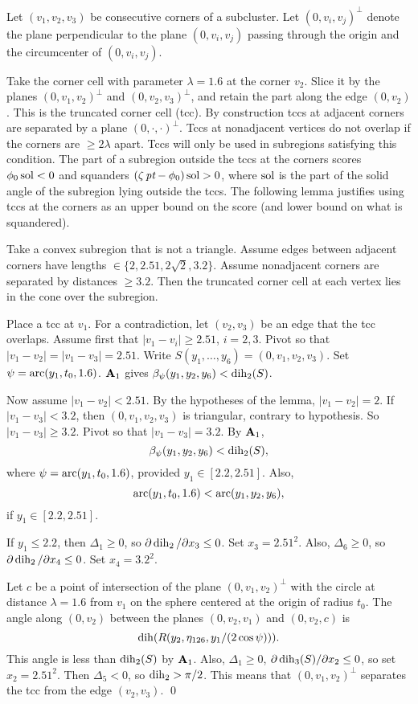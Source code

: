 Let $(v_1,v_2,v_3)$ be consecutive corners of a subcluster.
Let $(0,v_i,v_j)^\perp$ denote the plane perpendicular to the
plane $(0,v_i,v_j)$ passing through the origin and the
circumcenter of $(0,v_i,v_j)$.

Take the corner cell with parameter $\lambda=1.6$ at the corner
$v_2$.  Slice it by the planes $(0,v_1,v_2)^\perp$ and
$(0,v_2,v_3)^\perp$, and retain the part along the edge $(0,v_2)$.
This is the truncated corner cell (tcc).  By construction tccs
at adjacent corners are separated by a plane $(0,\cdot,\cdot)^\perp$.
Tccs at nonadjacent vertices do not overlap if the corners
are $\ge2\lambda$ apart.  Tccs will only be
used in subregions satisfying this condition.  The part of
a subregion outside the tccs at the corners scores $\phi_0\operatorname{sol}<0$
and squanders $(\zeta\,\hbox{\it pt}-\phi_0)\operatorname{sol}>0$, where $\operatorname{sol}$ is the part of
the solid
angle of the subregion lying outside the tccs.   The following
lemma justifies using tccs at the corners as an upper bound on
the score (and lower bound on what is squandered).


Take a convex subregion that is not a triangle.  Assume 
edges between adjacent corners have lengths $\in\{2,2.51,2\sqrt{2},3.2\}$.  
Assume nonadjacent
corners are separated by distances $\ge3.2$.
 Then the truncated corner cell at each vertex lies in the
cone over the subregion.
\endproclaim

 Place a tcc at $v_1$. For a contradiction,
let $(v_2,v_3)$ be an edge that the tcc overlaps.  Assume first
that $|v_1-v_i|\ge 2.51$, $i=2,3$.  Pivot so that
$|v_1-v_2|=|v_1-v_3|=2.51$.    Write
$S(y_1,\ldots,y_6)=(0,v_1,v_2,v_3)$.   
Set $\psi=\operatorname{arc}(y_1,t_0,1.6)$. ${\bold A}_1$ gives
$\beta_\psi(y_1,y_2,y_6)<\operatorname{dih}_2(S)$.

Now assume $|v_1-v_2|<2.51$.  By the hypotheses of the lemma,
$|v_1-v_2|=2$.  If $|v_1-v_3|<3.2$, then $(0,v_1,v_2,v_3)$
is triangular, contrary to hypothesis.  So $|v_1-v_3|\ge3.2$.
Pivot so that  $|v_1-v_3|=3.2$. By ${\bold A}_1$,
	$$\beta_\psi(y_1,y_2,y_6)< \operatorname{dih}_2(S),$$
where $\psi=\operatorname{arc}(y_1,t_0,1.6)$, provided $y_1\in[2.2,2.51]$.
Also, $$\operatorname{arc}(y_1,t_0,1.6)<\operatorname{arc}(y_1,y_2,y_6),$$ if $y_1\in[2.2,2.51]$.

If $y_1\le 2.2$, then $\Delta_1\ge0$, so
$\partial\operatorname{dih}_2/\partial x_3\le 0$.  Set $x_3=2.51^2$.
Also, $\Delta_6\ge0$, so $\partial\operatorname{dih}_2/\partial x_4\le0$.
Set $x_4=3.2^2$.

Let $c$ be a point of intersection of the plane $(0,v_1,v_2)^\perp$
with the circle at distance $\lambda=1.6$ from $v_1$ on the sphere
centered at the origin
of radius $t_0$.  The angle along $(0,v_2)$ between the planes
$(0,v_2,v_1)$ and $(0,v_2,c)$ is
	$$\operatorname{dih}(R(y_2,\eta_{126},y_1/(2\cos\psi))).$$
This angle is less than $\operatorname{dih}_2(S)$ by ${\bold A}_1$.
Also, $\Delta_1\ge0$, $\partial\operatorname{dih}_3(S)/\partial x_2\le0$,
so set $x_2=2.51^2$.
Then $\Delta_5<0$, so $\operatorname{dih}_2>\pi/2$.  This means that $(0,v_1,v_2)^\perp$
separates the tcc from the edge $(v_2,v_3)$.
\qed
\enddemo



